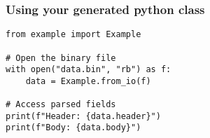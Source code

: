 
\begin{frame}[fragile]
\frametitle{Using your generated python class}

\begin{lstlisting}
from example import Example

# Open the binary file
with open("data.bin", "rb") as f:
    data = Example.from_io(f)

# Access parsed fields
print(f"Header: {data.header}")
print(f"Body: {data.body}")
\end{lstlisting}
\end{frame}
